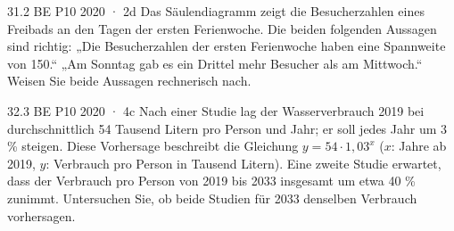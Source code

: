\documentclass[11pt]{article}
\begin{document}
\begin{pfaufgabe}{31.}{2 BE \textperiodcentered{} P10 2020 · 2d}
Das Säulendiagramm zeigt die Besucherzahlen eines Freibads an den Tagen der ersten Ferienwoche. Die beiden folgenden Aussagen sind richtig: „Die Besucherzahlen der ersten Ferienwoche haben eine Spannweite von 150.“ „Am Sonntag gab es ein Drittel mehr Besucher als am Mittwoch.“ Weisen Sie beide Aussagen rechnerisch nach.
\par\smallskip\noindent {}\par
{}
\end{pfaufgabe}
\begin{pfaufgabe}{32.}{3 BE \textperiodcentered{} P10 2020 · 4c}
Nach einer Studie lag der Wasserverbrauch 2019 bei durchschnittlich 54 Tausend Litern pro Person und Jahr; er soll jedes Jahr um 3 \% steigen. Diese Vorhersage beschreibt die Gleichung $y = 54\cdot 1{,}03^{x}$ ($x$: Jahre ab 2019, $y$: Verbrauch pro Person in Tausend Litern). Eine zweite Studie erwartet, dass der Verbrauch pro Person von 2019 bis 2033 insgesamt um etwa 40 \% zunimmt. Untersuchen Sie, ob beide Studien für 2033 denselben Verbrauch vorhersagen.
\end{pfaufgabe}
\end{document}
